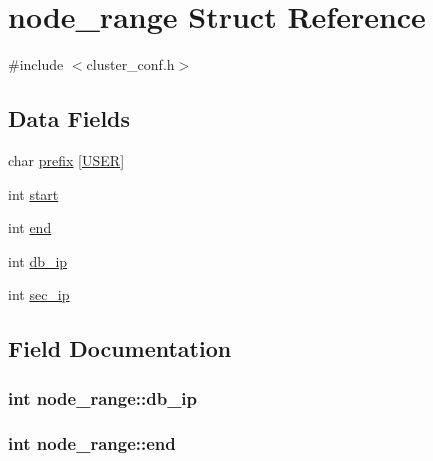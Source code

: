 \hypertarget{structnode__range}{}\section{node\+\_\+range Struct Reference}
\label{structnode__range}


{\ttfamily \#include $<$cluster\+\_\+conf.\+h$>$}

\subsection*{Data Fields}
\begin{DoxyCompactItemize}
\item 
char \hyperlink{structnode__range_a7a19ed1d62809e24427fc2364d8570dc}{prefix} \mbox{[}\hyperlink{cluster__conf_8h_a8bfbbf31b7d3c07215440d18a064b7f4}{U\+S\+ER}\mbox{]}
\item 
int \hyperlink{structnode__range_a8eceeed71190e61f7700a2013a0048c6}{start}
\item 
int \hyperlink{structnode__range_af04243fa977e6c81395ee1b950b896e1}{end}
\item 
int \hyperlink{structnode__range_a381c07eeccd0c4999c57e3f04e133330}{db\+\_\+ip}
\item 
int \hyperlink{structnode__range_a13fcb1bbb58d583415ace0fc11febf2f}{sec\+\_\+ip}
\end{DoxyCompactItemize}


\subsection{Field Documentation}
\subsubsection[{\texorpdfstring{db\+\_\+ip}{db_ip}}]{\setlength{\rightskip}{0pt plus 5cm}int node\+\_\+range\+::db\+\_\+ip}\hypertarget{structnode__range_a381c07eeccd0c4999c57e3f04e133330}{}\label{structnode__range_a381c07eeccd0c4999c57e3f04e133330}
\subsubsection[{\texorpdfstring{end}{end}}]{\setlength{\rightskip}{0pt plus 5cm}int node\+\_\+range\+::end}\hypertarget{structnode__range_af04243fa977e6c81395ee1b950b896e1}{}\label{structnode__range_af04243fa977e6c81395ee1b950b896e1}
